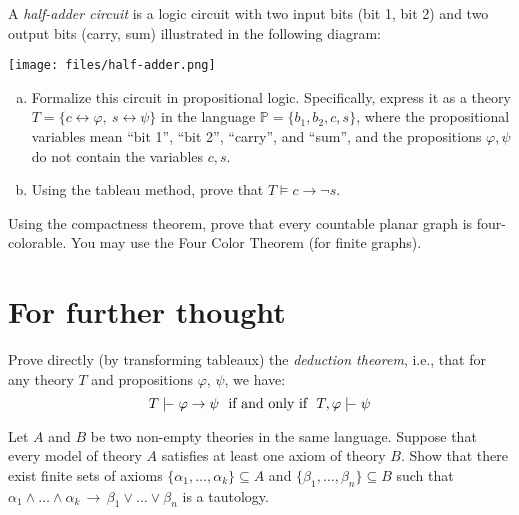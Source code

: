 \begin{problem}

    A \emph{half-adder circuit} is a logic circuit with two input bits (bit 1, bit 2) and two output bits (carry, sum) illustrated in the following diagram:
    \begin{center}
        \texttt{[image: files/half-adder.png]}
    \end{center}
    \begin{enumerate}[(a)]
            \item Formalize this circuit in propositional logic. Specifically, express it as a theory $T=\{c\leftrightarrow \varphi,\ s\leftrightarrow \psi\}$ in the language $\mathbb P=\{b_1,b_2,c,s\}$, where the propositional variables mean ``bit 1'', ``bit 2'', ``carry'', and ``sum'', and the propositions $\varphi,\psi$ do not contain the variables $c,s$.
            \item Using the tableau method, prove that $T\models c\to\neg s$.
    \end{enumerate}

\end{problem}


\begin{problem}

    Using the compactness theorem, prove that every countable planar graph is four-colorable. You may use the Four Color Theorem (for finite graphs).

\end{problem}


        
\section*{For further thought}
        
        
\begin{problem}

    Prove directly (by transforming tableaux) the \emph{deduction theorem}, i.e., that for any theory $T$ and propositions $\varphi$, $\psi$, we have:
    $$
    T \proves \varphi\to\psi\text{\ \ if and only if\ \ }T,\varphi\proves  \psi
    $$

\end{problem}


\begin{problem}
    Let $A$ and $B$ be two non-empty theories in the same language. Suppose that every model of theory $A$ satisfies at least one axiom of theory $B$. Show that there exist finite sets of axioms $\{\alpha_1,\dots,\alpha_k\}\subseteq A$ and $\{\beta_1,\dots,\beta_n\}\subseteq B$ such that $\alpha_1\wedge\dots\wedge\alpha_k\,\to\,\beta_1\vee\dots\vee\beta_n$ is a tautology.
\end{problem}

